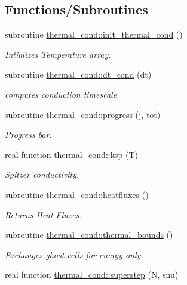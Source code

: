 \subsection*{Functions/\+Subroutines}
\begin{DoxyCompactItemize}
\item 
subroutine \hyperlink{namespacethermal__cond_ac611766519a4602033c83e3ed5ae3c00}{thermal\+\_\+cond\+::init\+\_\+thermal\+\_\+cond} ()
\begin{DoxyCompactList}\small\item\em Intializes Temperature array. \end{DoxyCompactList}\item 
subroutine \hyperlink{namespacethermal__cond_a9e4afd71cbe737fe5189bc6ecbb3a61f}{thermal\+\_\+cond\+::dt\+\_\+cond} (dt)
\begin{DoxyCompactList}\small\item\em computes conduction timescale \end{DoxyCompactList}\item 
subroutine \hyperlink{namespacethermal__cond_a5283f7a2b8b4a4226ce624fb49445f43}{thermal\+\_\+cond\+::progress} (j, tot)
\begin{DoxyCompactList}\small\item\em Progress bar. \end{DoxyCompactList}\item 
real function \hyperlink{namespacethermal__cond_ab3978fb62e485cf71d7c83e779e92615}{thermal\+\_\+cond\+::ksp} (T)
\begin{DoxyCompactList}\small\item\em Spitzer conductivity. \end{DoxyCompactList}\item 
subroutine \hyperlink{namespacethermal__cond_abc5c4fc622aea2f85fc5a0c2fee333bc}{thermal\+\_\+cond\+::heatfluxes} ()
\begin{DoxyCompactList}\small\item\em Returns Heat Fluxes. \end{DoxyCompactList}\item 
subroutine \hyperlink{namespacethermal__cond_a55e65df0c700580f8af0a090063d2e32}{thermal\+\_\+cond\+::thermal\+\_\+bounds} ()
\begin{DoxyCompactList}\small\item\em Exchanges ghost cells for energy only. \end{DoxyCompactList}\item 
real function \hyperlink{namespacethermal__cond_a535cc1746914d413d4978aeda7b8fc06}{thermal\+\_\+cond\+::superstep} (N, snu)

\end{DoxyCompactItemize}
